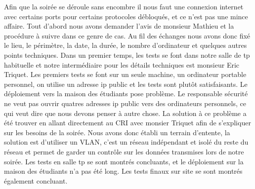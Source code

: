 Afin que la soirée se déroule sans encombre il nous faut une connexion internet avec certains ports pour certains protocoles débloqués,
 et ce n'est pas une mince affaire. Tout d'abord nous avons demander l'avis de monsieur Mathieu et la procédure à suivre dans ce genre de cas.
Au fil des échanges nous avons donc fixé le lieu, le périmètre, la date, la durée, le nombre d'ordinateur et quelques autres points techniques.
Dans un premier temps, les tests se font dans notre salle de tp habituelle et notre intermédiaire pour les détails techniques est monsieur Eric Triquet.
Les premiers tests se font sur un seule machine, un ordinateur portable personnel, on utilise un adresse ip public et les tests sont plutôt satisfaisants.
Le déploiement vers la maison des étudiants pose problème. Le responsable sécurité ne veut pas ouvrir quatres adresses ip public vers des ordinateurs personnels,
 ce qui veut dire que nous devons penser à autre chose.
La solution à ce problème a été trouver en allant directement au CRI avec monsier Triquet afin de s'expliquer sur les besoins de la soirée.
Nous avons donc établi un terrain d'entente, la solution est d'utiliser un VLAN, c'est un réseau indépendant et isolé du reste du réseau et permet de garder 
un contrôle sur les données transmises lors de notre soirée.
Les tests en salle tp se sont montrés concluants, et le déploiement sur la maison des étudiants n'a pas été long.
Les tests finaux sur site se sont montrés également concluant.
